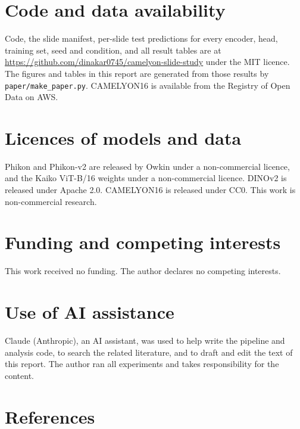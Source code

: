 \documentclass[11pt,a4paper]{article}
\begin{document}
\sloppy
\section*{Code and data availability}

Code, the slide manifest, per-slide test predictions for every encoder, head, training set, seed and condition, and all result tables are at \url{https://github.com/dinakar0745/camelyon-slide-study} under the MIT licence. The figures and tables in this report are generated from those results by \texttt{paper/make\_paper.py}. CAMELYON16 is available from the Registry of Open Data on AWS.

\section*{Licences of models and data}

Phikon and Phikon-v2 are released by Owkin under a non-commercial licence, and the Kaiko ViT-B/16 weights under a non-commercial licence. DINOv2 is released under Apache 2.0. CAMELYON16 is released under CC0. This work is non-commercial research.

\section*{Funding and competing interests}

This work received no funding. The author declares no competing interests.

\section*{Use of AI assistance}

Claude (Anthropic), an AI assistant, was used to help write the pipeline and analysis code, to search the related literature, and to draft and edit the text of this report. The author ran all experiments and takes responsibility for the content.

\section*{References}
\end{document}
